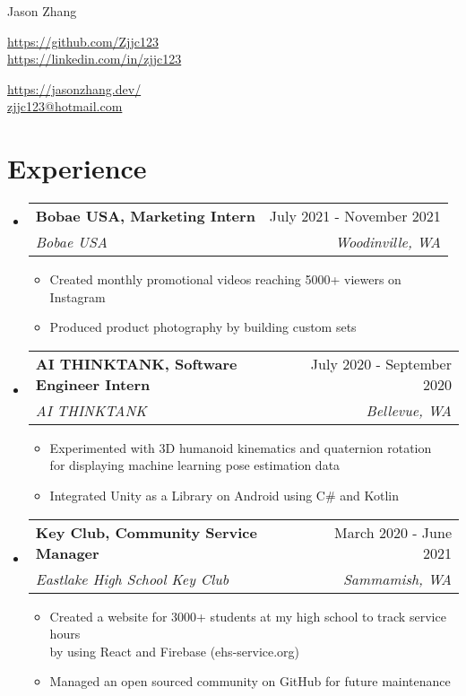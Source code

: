 \documentclass[letterpaper,10pt]{article}
\makeatletter
\newcommand{\resumeItem}[1]{
  \item\small{
    {#1 \vspace{-2pt}}
  }
}
\newcommand{\resumeSubheading}[4]{
  \vspace{-2pt}\item
    \begin{tabular*}{0.97\textwidth}[t]{l@{\extracolsep{\fill}}r}
      \textbf{#1} & #2 \\
      \textit{\small#3} & \textit{\small #4} \\
    \end{tabular*}\vspace{-7pt}
}
\newcommand{\resumeSubHeadingListStart}{\begin{itemize}[leftmargin=0.15in, label={}]}
\newcommand{\resumeSubHeadingListEnd}{\end{itemize}}
\newcommand{\resumeItemListStart}{\begin{itemize}}
\newcommand{\resumeItemListEnd}{\end{itemize}\vspace{-5pt}}
\makeatother
\begin{document}
\begin{center}
    {\large Jason Zhang} \\ \vspace{-2pt}
    \begin{multicols}{2}
    \begin{flushleft}
    \href{{your github page link}}{https://github.com/Zjjc123}\\
    \href{{your linkedin page link}}{https://linkedin.com/in/zjjc123}
    \end{flushleft}

    \begin{flushright}
    \href{{your personal websit link}}{https://jasonzhang.dev/}\\
    \href{mailto:{your email adress}}{zjjc123@hotmail.com}
    \end{flushright}
    \end{multicols}
\end{center}
\vspace{-15pt}
\section{Experience}
  \resumeSubHeadingListStart
    \resumeSubheading
      {Bobae USA, Marketing Intern}{July 2021 - November 2021}
      {Bobae USA}{Woodinville, WA}
      \resumeItemListStart
        \resumeItem{Created monthly promotional videos reaching 5000+ viewers on Instagram}
        \resumeItem{Produced product photography by building custom sets}
    \resumeItemListEnd
  \resumeSubHeadingListEnd
\vspace{-5pt}
  \resumeSubHeadingListStart
    \resumeSubheading
      {AI THINKTANK, Software Engineer Intern}{July 2020 - September 2020}
      {AI THINKTANK}{Bellevue, WA}
      \resumeItemListStart
        \resumeItem{Experimented with 3D humanoid kinematics and quaternion rotation \\ for displaying machine learning pose estimation data}
        \resumeItem{Integrated Unity as a Library on Android using C\# and Kotlin}
    \resumeItemListEnd
  \resumeSubHeadingListEnd
\vspace{-5pt}
  \resumeSubHeadingListStart
    \resumeSubheading
      {Key Club, Community Service Manager}{March 2020 - June 2021}
      {Eastlake High School Key Club}{Sammamish, WA}
      \resumeItemListStart
        \resumeItem{Created a website for 3000+ students at my high school to track service hours \\ by using React and Firebase (ehs-service.org)}
        \resumeItem{Managed an open sourced community on GitHub for future maintenance}
    \resumeItemListEnd
  \resumeSubHeadingListEnd
\vspace{-5pt}
\end{document}
